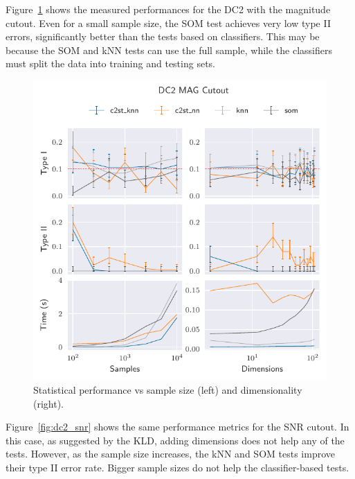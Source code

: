 Figure~\ref{fig:dc2_mag} shows the measured performances for the DC2 with the magnitude
cutout. Even for a small sample size, the \gls{SOM}  test achieves very low type II errors, 
significantly better than the tests based on classifiers.
This may be because the \gls{SOM} and \gls{kNN}
tests can use the full sample, while the classifiers must split the data into training and testing sets.


\begin{figure}[htpb]
    \centering
    \includegraphics{images/6_som/dc2_mag}
    \caption[Statistical performance vs sample size and dimensionality (DC2 Magnitude).]{
    Statistical performance vs sample size (left) and dimensionality (right).}
    \label{fig:dc2_mag}
\end{figure}

Figure~\ref{fig:dc2_snr} shows the same performance metrics for the \gls{SNR} cutout.
In this case, as suggested by the \gls{KLD}, adding dimensions does not help any of the tests.
However, as the sample size increases, the \gls{kNN} and \gls{SOM}
tests improve their type II error rate. Bigger sample sizes do not help
the classifier-based tests.

